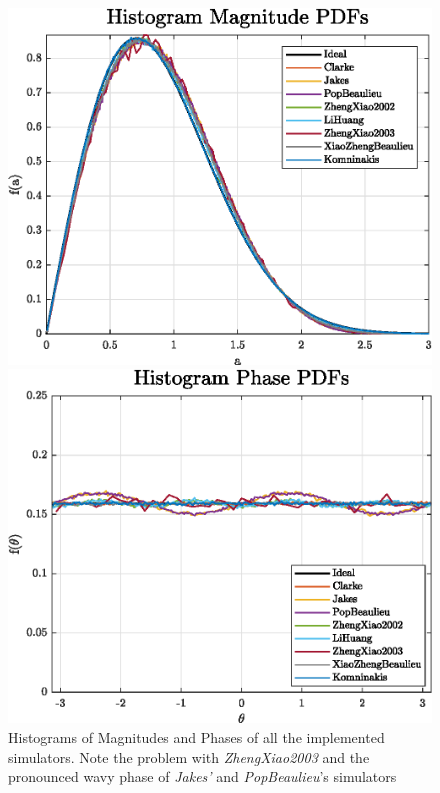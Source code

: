 \begin{figure}
\hfill
\begin{minipage}{.49\linewidth}
	\includegraphics[width=\linewidth]{img/histMag.eps}
\end{minipage}
\hfill
\begin{minipage}{.49\linewidth}
	\includegraphics[width=\linewidth]{img/histPhase.eps}
\end{minipage}
\hfill

\caption{Histograms of Magnitudes and Phases of all the implemented simulators. Note the problem with \textit{ZhengXiao2003} and the pronounced wavy phase of \textit{Jakes'} and \textit{PopBeaulieu}'s simulators}
\label{fig:histograms}
\end{figure}

